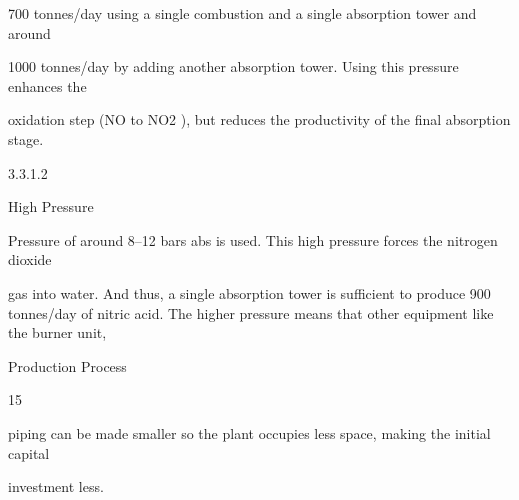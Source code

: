 \documentclass[a4paper,portrait,12pt]{article}
\begin{document}
\begin{flushleft}
700 tonnes/day using a single combustion and a single absorption tower and around
\end{flushleft}


\begin{flushleft}
1000 tonnes/day by adding another absorption tower. Using this pressure enhances the
\end{flushleft}


\begin{flushleft}
oxidation step (NO to NO2 ), but reduces the productivity of the final absorption stage.
\end{flushleft}





3.3.1.2





\begin{flushleft}
High Pressure
\end{flushleft}





\begin{flushleft}
Pressure of around 8--12 bars abs is used. This high pressure forces the nitrogen dioxide
\end{flushleft}


\begin{flushleft}
gas into water. And thus, a single absorption tower is sufficient to produce 900 tonnes/day of nitric acid. The higher pressure means that other equipment like the burner unit,
\end{flushleft}





\begin{flushleft}
\newpage
Production Process
\end{flushleft}





15





\begin{flushleft}
piping can be made smaller so the plant occupies less space, making the initial capital
\end{flushleft}


\begin{flushleft}
investment less.
\end{flushleft}
\end{document}
